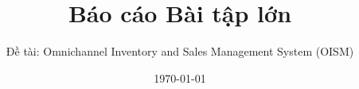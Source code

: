 \documentclass[a4paper,12pt]{book}
\begin{document}
\sloppy
\frontmatter
\title{Báo cáo Bài tập lớn}
\author{Đề tài: Omnichannel Inventory and Sales Management System (OISM)}
\date{\today}
\maketitle

\tableofcontents
\clearpage
\listoffigures
\clearpage
\listoftables
\clearpage

\mainmatter







\clearpage
\end{document}
